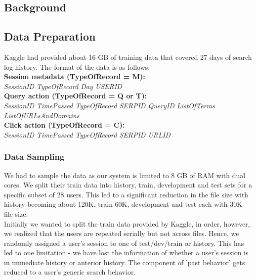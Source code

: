 \documentclass[11pt,letterpaper]{article}
\begin{document}
\subsection{Background}




\subsection{Data Preparation}
Kaggle had provided about 16 GB of training data that covered 27 days of search log history. The format of the data is as follows:\\
\textbf{Session metadata (TypeOfRecord = M):}\\
\textit {SessionID TypeOfRecord Day USERID}\\
\textbf{Query action (TypeOfRecord = Q or T):}\\
\textit{SessionID TimePassed TypeOfRecord SERPID QueryID ListOfTerms ListOfURLsAndDomains}\\
\textbf{Click action (TypeOfRecord = C):}\\
\textit{SessionID TimePassed TypeOfRecord SERPID URLID}\\
\subsubsection{Data Sampling}
We had to sample the data as our system is limited to 8 GB of RAM with dual cores. We split their train data into history, train, development and test sets for a specific subset of 28 users. This led to a significant reduction in the file size with history becoming about 120K, train 60K, development and test each with 30K file size.\\ Initially we wanted to split the train data provided by Kaggle, in order, however, we realized that the users are repeated serially but not across files. Hence, we randomly assigned a user's session to one of test/dev/train or history. This has led to one limitation - we have lost the information of whether a user's session is in immediate history or anterior history. The component of 'past behavior' gets reduced to a user's generic search behavior.\\
\end{document}
